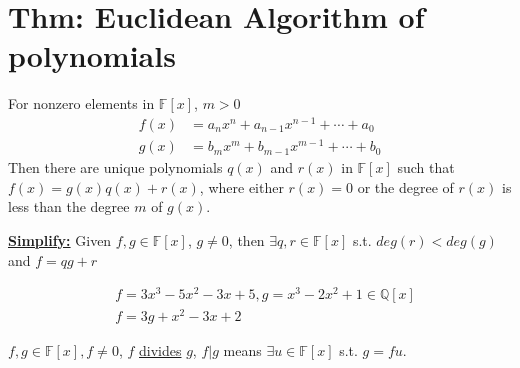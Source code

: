 \documentclass[11pt]{elegantbook}
\begin{document}
\section{Thm: Euclidean Algorithm of polynomials}
\begin{theorem}
    For nonzero elements in $\mathbb{F}[x]$, $m>0$
    \begin{equation}
        \begin{aligned}
            f(x)&=a_nx^n+a_{n-1}x^{n-1}+\cdots+a_0\\
            g(x)&=b_mx^m+b_{m-1}x^{m-1}+\cdots+b_0
        \end{aligned}
        \nonumber
    \end{equation}
    Then there are unique polynomials $q(x)$ and $r(x)$ in $\mathbb{F}[x]$ such that $f(x) = g(x)q(x) + r(x)$, where either $r(x) = 0$ or the degree of $r(x)$ is less than the degree $m$ of $g(x)$.
\end{theorem}
\underline{\textbf{Simplify:}}
    Given $f, g \in \mathbb{F}[x]$, $g \neq 0$, then $\exists q, r \in \mathbb{F}[x]$ s.t.
    $deg(r ) < deg(g)$
    and $f = qg + r$
\begin{example}
\begin{equation}
    \begin{aligned}
        &f = 3x^3 - 5x^2 - 3x + 5, g = x^3 - 2x^2 + 1 \in \mathbb{Q}[x]\\
        &f=3g+x^2-3x+2
    \end{aligned}
    \nonumber
\end{equation}
\end{example}

$f,g\in\mathbb{F}[x], f\neq0$, $f$ \underline{divides} $g$, $f|g$ means $\exists u\in\mathbb{F}[x]$ s.t. $g=fu$.
\end{document}
